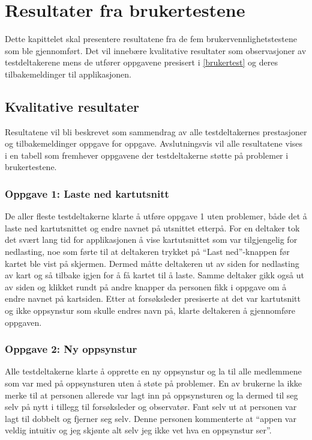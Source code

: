 \chapter{Resultater fra brukertestene} \label{resultater}
Dette kapittelet skal presentere resultatene fra de fem brukervennlighetstestene som ble gjennomført. Det vil innebære kvalitative resultater som observasjoner av testdeltakerene mens de utfører oppgavene presisert i \ref{brukertest} og deres tilbakemeldinger til applikasjonen. 

\section{Kvalitative resultater}
Resultatene vil bli beskrevet som sammendrag av alle testdeltakernes prestasjoner og tilbakemeldinger oppgave for oppgave. Avslutningsvis vil alle resultatene vises i en tabell som fremhever oppgavene der testdeltakerne støtte på problemer i brukertestene. 

\subsection{Oppgave 1: Laste ned kartutsnitt}
De aller fleste testdeltakerne klarte å utføre oppgave 1 uten problemer, både det å laste ned kartutsnittet og endre navnet på utsnittet etterpå. For en deltaker tok det svært lang tid for applikasjonen å vise kartutsnittet som var tilgjengelig for nedlasting, noe som førte til at deltakeren trykket på \enquote{Last ned}-knappen før kartet ble vist på skjermen. Dermed måtte deltakeren ut av siden for nedlasting av kart og så tilbake igjen for å få kartet til å laste. Samme deltaker gikk også ut av siden og klikket rundt på andre knapper da personen fikk i oppgave om å endre navnet på kartsiden. Etter at forsøksleder presiserte at det var kartutsnitt og ikke oppsynstur som skulle endres navn på, klarte deltakeren å gjennomføre oppgaven.

\subsection{Oppgave 2: Ny oppsynstur}
Alle testdeltakerne klarte å opprette en ny oppsynstur og la til alle medlemmene som var med på oppsynsturen uten å støte på problemer. En av brukerne la ikke merke til at personen allerede var lagt inn på oppsynsturen og la dermed til seg selv på nytt i tillegg til forsøksleder og observatør. Fant selv ut at personen var lagt til dobbelt og fjerner seg selv. Denne personen kommenterte at \enquote{appen var veldig intuitiv og jeg skjønte alt selv jeg ikke vet hva en oppsynstur ser}. 

